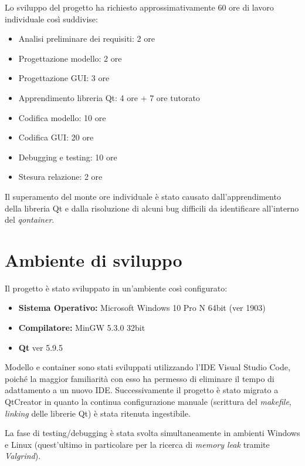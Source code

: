 \documentclass[
  10pt,
]{article}
\providecommand{\tightlist}{%
  \setlength{\itemsep}{0pt}\setlength{\parskip}{0pt}}
\begin{document}
Lo sviluppo del progetto ha richiesto approssimativamente 60 ore di
lavoro individuale così suddivise:

\begin{itemize}
\tightlist
\item
  Analisi preliminare dei requisiti: 2 ore
\item
  Progettazione modello: 2 ore
\item
  Progettazione GUI: 3 ore
\item
  Apprendimento libreria Qt: 4 ore + 7 ore tutorato
\item
  Codifica modello: 10 ore
\item
  Codifica GUI: 20 ore
\item
  Debugging e testing: 10 ore
\item
  Stesura relazione: 2 ore
\end{itemize}

Il superamento del monte ore individuale è stato causato
dall'apprendimento della libreria Qt e dalla risoluzione di alcuni bug
difficili da identificare all'interno del \emph{qontainer}.

\hypertarget{ambiente-di-sviluppo}{%
\section{Ambiente di sviluppo}\label{ambiente-di-sviluppo}}

Il progetto è stato sviluppato in un'ambiente così configurato:

\begin{itemize}
\tightlist
\item
  \textbf{Sistema Operativo:} Microsoft Windows 10 Pro N 64bit (ver
  1903)
\item
  \textbf{Compilatore:} MinGW 5.3.0 32bit
\item
  \textbf{Qt} ver 5.9.5
\end{itemize}

Modello e container sono stati sviluppati utilizzando l'IDE Visual
Studio Code, poiché la maggior familiarità con esso ha permesso di
eliminare il tempo di adattamento a un nuovo IDE. Successivamente il
progetto è stato migrato a QtCreator in quanto la continua
configurazione manuale (scrittura del \emph{makefile}, \emph{linking}
delle librerie Qt) è stata ritenuta ingestibile.

La fase di testing/debugging è stata svolta simultaneamente in ambienti
Windows e Linux (quest'ultimo in particolare per la ricerca di
\emph{memory leak} tramite \emph{Valgrind}).
\end{document}
